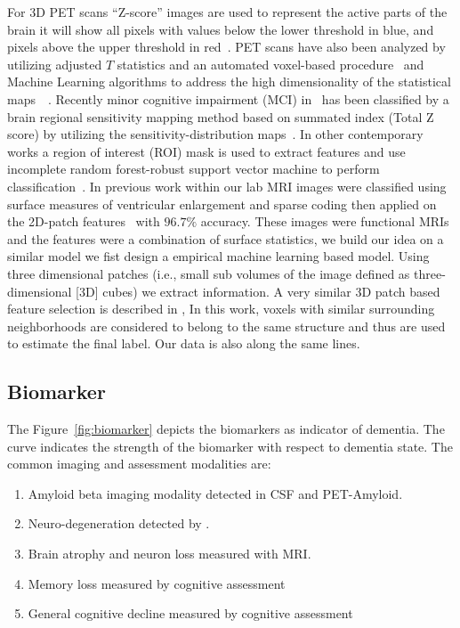For 3D PET scans ``Z-score'' images are used to represent the active parts of the brain it will show all pixels with values below the lower threshold in blue, and pixels above the upper threshold in red~\citep{ishii2014pet}. PET scans have also been analyzed by utilizing adjusted $T$ statistics and an automated voxel-based procedure~\citep{herholz2002discrimination} and Machine Learning algorithms to address the high dimensionality of the statistical maps~\citep{illan201118}~\citep{higdon2004comparison}. Recently minor cognitive impairment (MCI) in \FDGPET ~has been classified by a brain regional sensitivity mapping method based on summated index (Total Z score) by utilizing the sensitivity-distribution maps~\citep{kakimoto2011new}. In other contemporary works a region of interest (ROI) mask is used to extract features and use incomplete random forest-robust support vector machine to perform classification~\citep{lu2017early}. In previous work within our lab MRI images were classified using surface measures of ventricular enlargement and sparse coding then applied on the 2D-patch features~\citep*{zhang2016hyperbolic,zhang2016applying} with $ 96.7 \% $ accuracy. These images were functional MRIs and the features were a combination of surface statistics, we build our idea on a similar model we fist design a empirical machine learning based model. Using three dimensional patches (i.e., small sub volumes of the image defined as three-dimensional [3D] cubes) we extract information. A very similar 3D patch based feature selection is described in \citep{coupe2011patch}, In  this work, voxels  with  similar  surrounding  neighborhoods  are  considered  to  belong  to  the  same  structure and thus are used to estimate the final label. Our data is also along the same lines. 

\subsection{Biomarker}
The Figure~\ref{fig:biomarker} depicts the biomarkers as indicator of dementia. The curve indicates the strength of the biomarker with respect to dementia state. The common imaging and assessment modalities are:
\begin{enumerate}
	\item Amyloid beta imaging modality detected in CSF and PET-Amyloid.
	\item Neuro-degeneration detected by \FDGPET.
	\item Brain atrophy and neuron loss measured with MRI.
	\item Memory loss measured by cognitive assessment
	\item General cognitive decline measured by cognitive assessment 
\end{enumerate}

